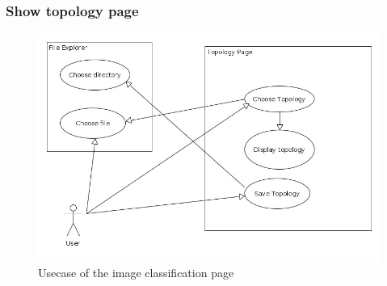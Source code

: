\documentclass[parskip=full]{scrartcl}
\begin{document}
\subsubsection{Show topology page}
\begin{figure}[htb!]
\centering
\includegraphics[width=\textwidth]{ShowTopoUsecase}
\caption{Usecase of the image classification page}
\end{figure}
\newpage
\end{document}
